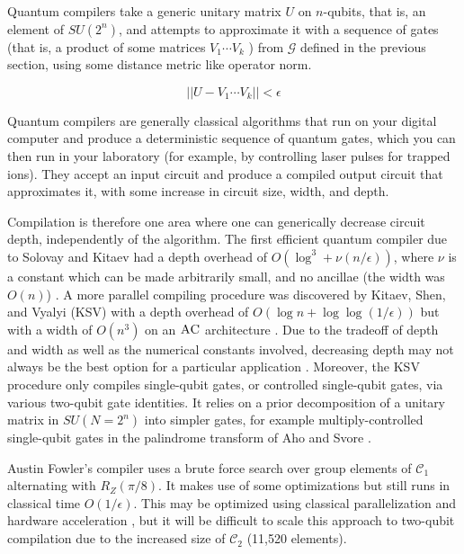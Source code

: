 Quantum compilers take a
generic unitary matrix $U$ on $n$-qubits, that is, an element of $SU(2^n)$, and
attempts to approximate it with a sequence of gates
(that is, a product of some matrices $V_1\cdots V_k$ )
from $\mathcal{G}$
defined in the previous section, using some distance metric like
operator norm.

\begin{equation}
|| U - V_1\cdots V_k || < \epsilon
\end{equation}

Quantum compilers are generally classical algorithms that run on your
digital computer and produce a deterministic sequence of quantum gates, which
you can then run in your laboratory (for example, by controlling laser pulses
for trapped ions). They accept an input circuit and produce a compiled
output circuit that approximates it, with some increase in circuit size,
width, and depth.

Compilation is therefore
one area where one can generically decrease circuit depth, independently of the
algorithm. The first efficient quantum compiler due to
Solovay and Kitaev had a depth overhead of $O(\log^3+\nu(n/\epsilon))$,
where $\nu$ is a constant which can be made arbitrarily small, and no
ancillae (the width was $O(n)$) \cite{Dawson2005}.
A more parallel compiling procedure was discovered by Kitaev, Shen, and
Vyalyi (KSV) with a depth overhead of $O(\log n + \log\log(1/\epsilon))$ but
with a width of $O(n^3)$ on an $\textsc{AC}$ architecture \cite{Kitaev2002}.
Due to the tradeoff of depth and width as well as the numerical constants
involved, decreasing depth may not always be the best option for a particular
application \cite{Pham2012a}. Moreover, the KSV procedure only compiles
single-qubit gates, or controlled single-qubit gates, via various
two-qubit gate identities. It relies on a prior decomposition of
a unitary matrix in $SU(N=2^n)$ into simpler gates,
for example multiply-controlled single-qubit gates in
the palindrome transform of Aho and Svore \cite{Aho2003}.

Austin Fowler's compiler uses a brute force search over group elements of
$\mathcal{C}_1$ alternating with $R_Z(\pi/8)$. It makes use of some
optimizations but still runs in classical time $O(1/\epsilon)$.
This may be optimized using classical parallelization and hardware acceleration
\cite{Booth2012}, but it will be difficult to scale this approach to
two-qubit compilation due to the increased size of $\mathcal{C}_2$ (11,520
elements).